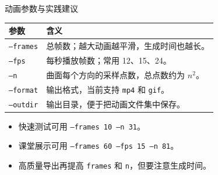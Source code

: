 \documentclass[aspectratio=169,11pt]{ctexbeamer}
\begin{document}
\begin{frame}{动画参数与实践建议}
  \begin{tabularx}{\linewidth}{@{}lX@{}}
    \toprule
    参数 & 含义 \\
    \midrule
    \texttt{--frames} & 总帧数；越大动画越平滑，生成时间也越长。 \\
    \texttt{--fps} & 每秒播放帧数；常用 12、15、24。 \\
    \texttt{--n} & 曲面每个方向的采样点数，总点数约为 \(n^2\)。 \\
    \texttt{--format} & 输出格式，当前支持 \texttt{mp4} 和 \texttt{gif}。 \\
    \texttt{--outdir} & 输出目录，便于把动画文件集中保存。 \\
    \bottomrule
  \end{tabularx}

  \vspace{0.8em}
  \begin{itemize}
    \item 快速测试可用 \texttt{--frames 10 --n 31}。
    \item 课堂展示可用 \texttt{--frames 60 --fps 15 --n 81}。
    \item 高质量导出再提高 \texttt{frames} 和 \texttt{n}，但要注意生成时间。
  \end{itemize}
\end{frame}
\end{document}
